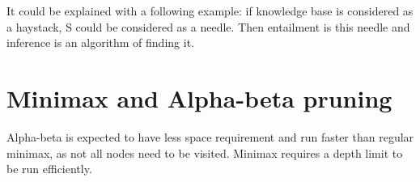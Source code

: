 \documentclass[a4paper, 12pt]{article}
\begin{document}
It could be explained with a following example: if knowledge base is considered as a haystack, S could be considered as a needle. Then entailment is this needle and inference is an algorithm of finding it.


\section{Minimax and Alpha-beta pruning}

Alpha-beta is expected to have less space requirement and run faster than regular minimax,
as not all nodes need to be visited. Minimax requires a depth limit to be run efficiently.
\end{document}
